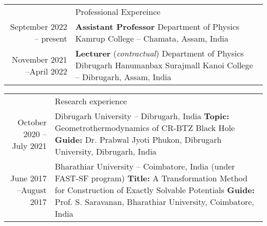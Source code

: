 \documentclass[a4paper, 11pt]{article}
\newcommand{\headingfont}{\Large\color{Bittersweet}}
\newenvironment{SectionTable}[1]{
	\renewcommand*{\arraystretch}{1.7}
	\setlength{\tabcolsep}{10pt}
	\begin{longtable}{Rp{5.2in}} & #1 \\}
{\end{longtable}\vspace{-.3cm}}
\begin{document}
\begin{SectionTable}{\headingfont Professional Expereince}

September 2022 -- present & 
\textbf{Assistant Professor} \newline
Department of Physics\newline
Kamrup College -- Chamata, Assam, India  \\


November 2021 --April 2022 & 
\textbf{Lecturer} (\textit{contractual}) \newline
Department of Physics\newline
Dibrugarh Hanumanbax Surajmall Kanoi College -- Dibrugarh, Assam, India  \\


\end{SectionTable}













\begin{SectionTable}{\headingfont Research experience}

October 2020 --July 2021 &
Dibrugarh University -- Dibrugarh, India \newline
\textbf{Topic:} Geometrothermodynamics of CR-BTZ Black Hole \newline
\textbf{Guide:} Dr. Prabwal Jyoti Phukon, Dibrugarh University, Dibrugarh, India  \\

June 2017 --August 2017 &
Bharathiar University -- Coimbatore, India (under FAST-SF program) \newline
\textbf{Title:} A Transformation Method for Construction of Exactly Solvable Potentials \newline
\textbf{Guide:} Prof. S. Saravanan, Bharathiar University, Coimbatore, India
\\
\end{SectionTable}
\end{document}
